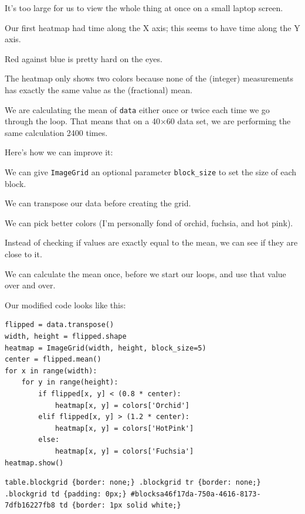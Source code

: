 \documentclass{book}
\begin{document}
\begin{swcenumerate}
\item
  It's too large for us to view the whole thing at once on a small
  laptop screen.
\item
  Our first heatmap had time along the X axis; this seems to have time
  along the Y axis.
\item
  Red against blue is pretty hard on the eyes.
\item
  The heatmap only shows two colors because none of the (integer)
  measurements has exactly the same value as the (fractional) mean.
\item
  We are calculating the mean of \texttt{data} either once or twice each
  time we go through the loop. That means that on a 40×60 data set, we
  are performing the same calculation 2400 times.
\end{swcenumerate}

Here's how we can improve it:

\begin{swcenumerate}
\item
  We can give \texttt{ImageGrid} an optional parameter
  \texttt{block\_size} to set the size of each block.
\item
  We can transpose our data before creating the grid.
\item
  We can pick better colors (I'm personally fond of orchid, fuchsia, and
  hot pink).
\item
  Instead of checking if values are exactly equal to the mean, we can
  see if they are close to it.
\item
  We can calculate the mean once, before we start our loops, and use
  that value over and over.
\end{swcenumerate}

Our modified code looks like this:

\begin{verbatim}
flipped = data.transpose()
width, height = flipped.shape
heatmap = ImageGrid(width, height, block_size=5)
center = flipped.mean()
for x in range(width):
    for y in range(height):
        if flipped[x, y] < (0.8 * center):
            heatmap[x, y] = colors['Orchid']
        elif flipped[x, y] > (1.2 * center):
            heatmap[x, y] = colors['HotPink']
        else:
            heatmap[x, y] = colors['Fuchsia']
heatmap.show()
\end{verbatim}

\begin{verbatim}
table.blockgrid {border: none;} .blockgrid tr {border: none;} .blockgrid td {padding: 0px;} #blocksa46f17da-750a-4616-8173-7dfb16227fb8 td {border: 1px solid white;}
\end{verbatim}
\end{document}

